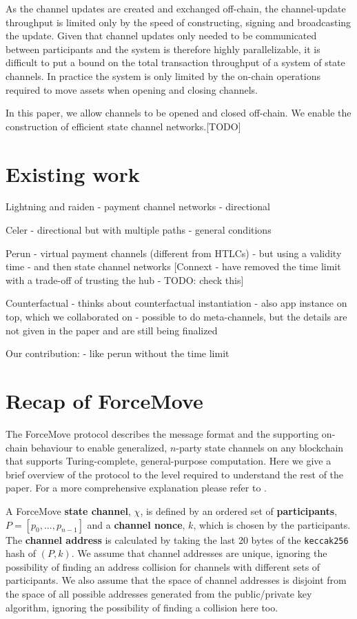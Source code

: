 \documentclass{article}
\theoremstyle{definition}
\begin{document}
As the channel updates are created and exchanged off-chain, the channel-update throughput is limited only by the speed of constructing, signing and broadcasting the update.
Given that channel updates only needed to be communicated between participants and the system is therefore highly parallelizable, it is difficult to put a bound on the total transaction throughput of a system of state channels.
In practice the system is only limited by the on-chain operations required to move assets when opening and closing channels.

In this paper, we allow channels to be opened and closed off-chain. We enable the construction of efficient state channel networks.[TODO]

\section{Existing work}

Lightning and raiden
- payment channel networks
- directional

Celer
- directional but with multiple paths
- general conditions

Perun
- virtual payment channels (different from HTLCs)
- but using a validity time
- and then state channel networks
[Connext - have removed the time limit with a trade-off of trusting the hub - TODO: check this]

Counterfactual
- thinks about counterfactual instantiation
- also app instance on top, which we collaborated on
- possible to do meta-channels, but the details are not given in the paper and are still being finalized


Our contribution:
- like perun without the time limit


\section{Recap of ForceMove}

The ForceMove protocol describes the message format and the supporting on-chain behaviour
to enable generalized, $n$-party state channels on any blockchain that supports Turing-complete, general-purpose computation.
Here we give a brief overview of the protocol to the level required to understand
the rest of the paper. For a more comprehensive explanation please refer to \cite{}.

A ForceMove \textbf{state channel}, $\chi$, is defined by an ordered set of \textbf{participants}, $P = [p_0, ..., p_{n-1}]$ and a \textbf{channel nonce}, $k$, which is chosen by the participants.
The \textbf{channel address} is calculated by taking the last 20 bytes of the \texttt{keccak256}
hash of $(P, k)$.
We assume that channel addresses are unique, ignoring the possibility of finding an address
collision for channels with different sets of participants. 
We also assume that the space of channel addresses is disjoint from the space of all possible addresses generated from the public/private key algorithm, ignoring
the possibility of finding a collision here too.
\end{document}

